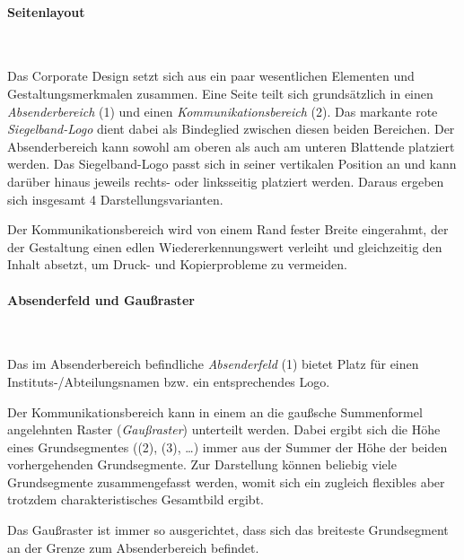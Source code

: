 \paragraph{Seitenlayout}\hfill\\
\begin{minipage}[t]{0.45\textwidth}
\vspace*{0pt}
\centering{}%
\end{minipage}
\begin{minipage}[t]{0.55\textwidth}
\vspace*{0pt}
Das Corporate Design setzt sich aus ein paar wesentlichen Elementen und
Gestaltungsmerkmalen zusammen.
Eine Seite teilt sich grundsätzlich in einen \emph{Absenderbereich} (1) und einen
\emph{Kommunikationsbereich} (2).
Das markante rote \emph{Siegelband-Logo} dient dabei als Bindeglied zwischen
diesen beiden Bereichen. 
Der Absenderbereich kann sowohl am oberen als auch am unteren Blattende
platziert werden.
Das Siegelband-Logo passt sich in seiner vertikalen Position an und kann darüber hinaus
jeweils rechts- oder linksseitig platziert werden.
Daraus ergeben sich insgesamt 4 Darstellungsvarianten.

Der Kommunikationsbereich wird von einem Rand fester Breite eingerahmt,
der der Gestaltung einen edlen Wiedererkennungswert verleiht und gleichzeitig
den Inhalt absetzt, um Druck- und Kopierprobleme zu vermeiden.
\end{minipage}\bigskip

\paragraph{Absenderfeld und Gaußraster}\hfill\\
\begin{minipage}[t]{0.45\textwidth}
\vspace*{0pt}
\centering{}%
\end{minipage}
\begin{minipage}[t]{0.55\textwidth}
\vspace*{0pt}
Das im Absenderbereich befindliche \emph{Absenderfeld} (1) bietet Platz für
einen Instituts-/Abteilungsnamen bzw. ein entsprechendes Logo.

Der Kommunikationsbereich kann in einem an die gaußsche Summenformel
angelehnten Raster (\emph{Gaußraster}) unterteilt werden.
Dabei ergibt sich die Höhe eines Grundsegmentes ((2), (3), \ldots)
immer aus der Summer der Höhe der beiden vorhergehenden Grundsegmente.
Zur Darstellung können beliebig viele Grundsegmente zusammengefasst werden,
womit sich ein zugleich flexibles aber trotzdem charakteristisches
Gesamtbild ergibt.

Das Gaußraster ist immer so ausgerichtet, dass sich das breiteste Grundsegment
an der Grenze zum Absenderbereich befindet.
\end{minipage}

